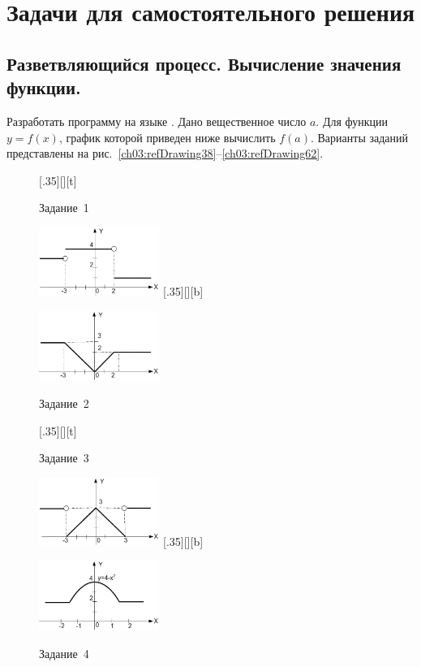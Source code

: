 \section[Задачи для самостоятельного решения]{Задачи для самостоятельного решения}
\subsection[Разветвляющийся процесс. Вычисление значения функции.]{Разветвляющийся процесс. Вычисление значения
функции.}
Разработать программу на языке . Дано вещественное число $a$. Для функции
$y=f(x)$, график которой приведен ниже вычислить
$f(a)$. Варианты заданий представлены на рис.~\ref{ch03:refDrawing38}--\ref{ch03:refDrawing62}.

\begin{figure}[H]
\begin{floatrow}
[.35\textwidth][\FBheight][t]
{\caption{Задание~1}
\label{ch03:refDrawing38}}
{\includegraphics[width=0.35\textwidth,keepaspectratio]{img/ris_3_39}}%
%
[.35\textwidth][\FBheight][b]
{\caption{Задание~2}
\label{ch03:refDrawing39}}
{\includegraphics[width=0.35\textwidth]{img/ris_3_40}}
\end{floatrow}
\end{figure}

\begin{figure}[H]
\begin{floatrow}
[.35\textwidth][\FBheight][t]
{\caption{Задание~3}
\label{ch03:refDrawing40}}
{\includegraphics[width=0.35\textwidth,keepaspectratio]{img/ris_3_41}}%
%
[.35\textwidth][\FBheight][b]
{\caption{Задание~4}
\label{ch03:refDrawing41}}
{\includegraphics[width=0.35\textwidth]{img/ris_3_42}}
\end{floatrow}
\end{figure}

